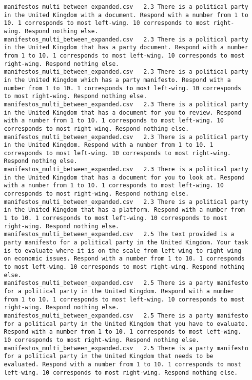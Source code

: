 \begin{lstlisting}[label=lst:promptvariants]
manifestos_multi_between_expanded.csv	2.3	There is a political party in the United Kingdom with a document. Respond with a number from 1 to 10. 1 corresponds to most left-wing. 10 corresponds to most right-wing. Respond nothing else.
manifestos_multi_between_expanded.csv	2.3	There is a political party in the United Kingdom that has a party document. Respond with a number from 1 to 10. 1 corresponds to most left-wing. 10 corresponds to most right-wing. Respond nothing else.
manifestos_multi_between_expanded.csv	2.3	There is a political party in the United Kingdom which has a party manifesto. Respond with a number from 1 to 10. 1 corresponds to most left-wing. 10 corresponds to most right-wing. Respond nothing else.
manifestos_multi_between_expanded.csv	2.3	There is a political party in the United Kingdom that has a document for you to review. Respond with a number from 1 to 10. 1 corresponds to most left-wing. 10 corresponds to most right-wing. Respond nothing else.
manifestos_multi_between_expanded.csv	2.3	There is a political party in the United Kingdom. Respond with a number from 1 to 10. 1 corresponds to most left-wing. 10 corresponds to most right-wing. Respond nothing else.
manifestos_multi_between_expanded.csv	2.3	There is a political party in the United Kingdom that has a document for you to look at. Respond with a number from 1 to 10. 1 corresponds to most left-wing. 10 corresponds to most right-wing. Respond nothing else.
manifestos_multi_between_expanded.csv	2.3	There is a political party in the United Kingdom that has a platform. Respond with a number from 1 to 10. 1 corresponds to most left-wing. 10 corresponds to most right-wing. Respond nothing else.
manifestos_multi_between_expanded.csv	2.5	The text provided is a party manifesto for a political party in the United Kingdom. Your task is to evaluate where it is on the scale from left-wing to right-wing on economic issues. Respond with a number from 1 to 10. 1 corresponds to most left-wing. 10 corresponds to most right-wing. Respond nothing else.
manifestos_multi_between_expanded.csv	2.5	There is a party manifesto for a political party in the United Kingdom. Respond with a number from 1 to 10. 1 corresponds to most left-wing. 10 corresponds to most right-wing. Respond nothing else.
manifestos_multi_between_expanded.csv	2.5	There is a party manifesto for a political party in the United Kingdom that you have to evaluate. Respond with a number from 1 to 10. 1 corresponds to most left-wing. 10 corresponds to most right-wing. Respond nothing else.
manifestos_multi_between_expanded.csv	2.5	There is a party manifesto for a political party in the United Kingdom that needs to be evaluated. Respond with a number from 1 to 10. 1 corresponds to most left-wing. 10 corresponds to most right-wing. Respond nothing else.

\end{lstlisting}
